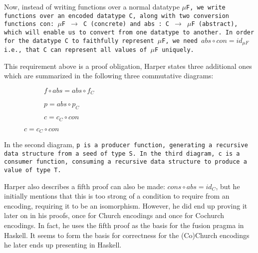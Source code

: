 Now, instead of writing functions over a normal datatype \tt{$\mu$F}, we write functions over an encoded datatype \tt{C}, along with two conversion functions \tt{con: $\mu$F $\to$ C} (concrete) and \tt{abs : C $\to$ $\mu$F} (abstract), which will enable us to convert from one datatype to another.
In order for the datatype \tt{C} to faithfully represent \tt{$\mu$F}, we need $abs \circ con = id_{\mu F}$ i.e., that \tt{C} can represent all values of \tt{$\mu$F} uniquely.

This requirement above is a proof obligation, Harper states three additional ones which are summarized in the following three commutative diagrams:

\begin{figure}[H]\hfill
    \begin{subfigure}{0.3\textwidth}
        \hfill{}\hfill\null
        \caption{$f\circ abs = abs\circ f_C$}
    \end{subfigure}
    \begin{subfigure}{0.3\textwidth}
        \hfill{}\hfill\null
        \caption{$p = abs\circ p_C$}
    \end{subfigure}
    \begin{subfigure}{0.3\textwidth}
        \hfill{}\hfill\null
        \caption{$c = c_C\circ con$}
    \end{subfigure}
\end{figure}

In the second diagram, \tt{p} is a producer function, generating a recursive data structure from a seed of type \tt{S}.
In the third diagram, \tt{c} is a consumer function, consuming a recursive data structure to produce a value of type \tt{T}.

Harper also describes a fifth proof can also be made: $cons \circ abs = id_C$,
but he initially mentions that this is too strong of a condition to require from an encoding, requiring it to be an isomorphism.
However, he did end up proving it later on in his proofs, once for Church encodings and once for Cochurch encodings.
In fact, he uses the fifth proof as the basis for the fusion pragma in Haskell.
It seems to form the basis for correctness for the (Co)Church encodings he later ends up presenting in Haskell.

